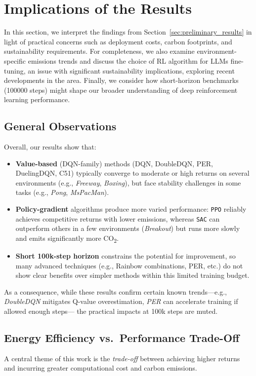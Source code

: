 \section{Implications of the Results}
\label{sec:implications_results}
In this section, we interpret the findings from Section~\ref{sec:preliminary_results} in light of practical concerns such as deployment costs, carbon footprints, and sustainability requirements. For completeness, we also examine environment-specific emissions trends and discuss the choice of RL algorithm for LLMs fine-tuning, an issue with significant sustainability implications, exploring recent developments in the area. Finally, we consider how short-horizon benchmarks (\num{100000} steps) might shape our broader understanding of deep reinforcement learning performance.

\subsection{General Observations}
\label{subsec:general_observations}
Overall, our results show that:
\begin{itemize}
	\item \textbf{Value-based} (DQN-family) methods (DQN, DoubleDQN, PER, DuelingDQN, 
	C51) typically converge to moderate or high returns on several environments 
	(e.g., \emph{Freeway}, \emph{Boxing}), 
	but face stability challenges in some tasks (e.g., \emph{Pong}, \emph{MsPacMan}). 
	\item \textbf{Policy-gradient} algorithms produce more varied performance: 
	\texttt{PPO} reliably achieves competitive returns with lower emissions, 
	whereas \texttt{SAC} can outperform others in a few environments (\emph{Breakout}) 
	but runs more slowly and emits significantly more CO\textsubscript{2}.
	\item \textbf{Short 100k-step horizon} constrains the potential for improvement, 
	so many advanced techniques (e.g., Rainbow combinations, PER, etc.) 
	do not show clear benefits over simpler methods within this limited training budget.
\end{itemize}

As a consequence, while these results confirm certain known trends—e.g., \emph{DoubleDQN} 
mitigates Q-value overestimation, \emph{PER} can accelerate training if allowed enough steps—
the practical impacts at 100k steps are muted.

\subsection{Energy Efficiency vs.\ Performance Trade-Off}
\label{subsec:energy_vs_perf}
A central theme of this work is the \emph{trade-off} between achieving higher returns 
and incurring greater computational cost and carbon emissions.

